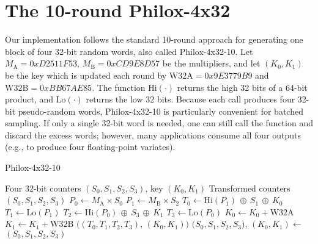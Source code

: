 \section{The 10-round Philox-4x32}
Our implementation follows the standard 10-round approach for generating one block of four 32-bit random words, also called Philox-4x32-10. Let \(M_{\mathrm{A}}=0xD2511F53\), \(M_{\mathrm{B}}=0xCD9E8D57\) be the multipliers, and let \((K_0, K_1)\) be the key which is updated each round by \(\mathrm{W32A}=0x9E3779B9\) and \(\mathrm{W32B}=0xBB67AE85\). The function \(\text{Hi}(\cdot)\) returns the high 32 bits of a 64-bit product, and \(\text{Lo}(\cdot)\) returns the low 32 bits. Because each call produces four 32-bit pseudo-random words, Philox-4x32-10 is particularly convenient for batched sampling. If only a single 32-bit word is needed, one can still call the function and discard the excess words; however, many applications consume all four outputs (e.g., to produce four floating-point variates).

\begin{algorithm}[ht]
  \caption{Philox-4x32-10}\label{alg:philox}
  \begin{algorithmic}[1]
    \Require Four 32-bit counters $(S_0,S_1,S_2,S_3)$,
            key $(K_0,K_1)$
    \Ensure  Transformed counters $(S_0,S_1,S_2,S_3)$
    \Statex
      \State $P_0 \gets M_{\text{A}}\times S_0$ 
      \State $P_1 \gets M_{\text{B}}\times S_2$ 
      \State $T_0 \gets \mathrm{Hi}(P_1)\,\oplus\,S_1\,\oplus\,K_0$
      \State $T_1 \gets \mathrm{Lo}(P_1)$
      \State $T_2 \gets \mathrm{Hi}(P_0)\,\oplus\,S_3\,\oplus\,K_1$
      \State $T_3 \gets \mathrm{Lo}(P_0)$
      \State $K_0 \gets K_0 + \mathrm{W32A}$
      \State $K_1 \gets K_1 + \mathrm{W32B}$
      \State \Return $\bigl((T_0,T_1,T_2,T_3),\,(K_0,K_1)\bigr)$
    \EndProcedure
    \Statex
        \State $\bigl(S_0,S_1,S_2,S_3),\,(K_0,K_1) \gets$
      \EndFor
      \State \Return $(S_0,S_1,S_2,S_3)$
    \EndProcedure
  \end{algorithmic}
\end{algorithm}

